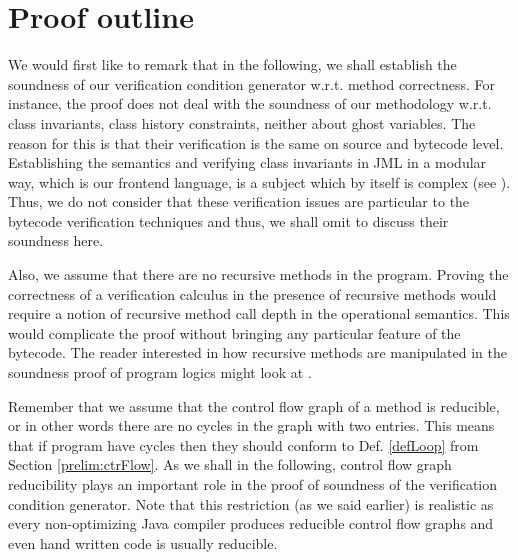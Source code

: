 \section{Proof outline} \label{proof:outline}
 We would first like to remark that in the following, we shall establish the soundness of our verification condition generator
 w.r.t. method correctness. For instance, the proof does not deal with the soundness of our
 methodology w.r.t. class invariants, class history constraints, neither about ghost variables. The reason for
 this is that their verification is the same on source and bytecode level. Establishing the semantics and 
 verifying class invariants in JML in a modular way, which is our frontend language, is a subject which  by itself
 is complex (see \cite{barnett03verification}). Thus,  we do not consider that these verification issues are particular
 to the bytecode verification  techniques and thus, we shall omit to discuss their soundness here. 

Also, we assume that there are no recursive methods in the program. 
Proving the correctness of a verification calculus in the presence 
of recursive methods would require a notion of recursive method call depth in the operational
semantics. This would complicate the proof without bringing any particular feature of the bytecode.
The reader interested in how recursive methods are manipulated in the soundness proof
of program logics might look at \cite{Nipkow-MOD2001}.  

Remember that we assume that the control flow graph of a method is reducible, or in other words there 
are no cycles in the graph with two entries. This means that if program have cycles then they should 
conform to Def. \ref{defLoop} from Section \ref{prelim:ctrFlow}.
As we shall in the following, control flow graph reducibility plays an important role in
 the proof of soundness of the verification condition generator. 
Note that this restriction (as we said earlier) is realistic as every non-optimizing Java compiler produces
reducible control flow graphs and even hand written code is usually reducible.


